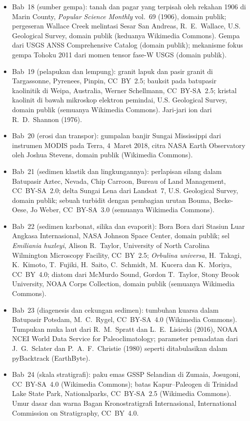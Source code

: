 \begin{itemize}
  \item Bab~18 (sumber gempa): tanah dan pagar yang terpisah oleh rekahan 1906 di Marin County, \emph{Popular Science Monthly} vol.~69 (1906), domain publik; pergeseran Wallace Creek melintasi Sesar San Andreas, R.~E.~Wallace, U.S. Geological Survey, domain publik (keduanya Wikimedia Commons). Gempa dari USGS ANSS Comprehensive Catalog (domain publik); mekanisme fokus gempa Tohoku 2011 dari momen tensor fase-W USGS (domain publik).
  \item Bab~19 (pelapukan dan lempung): granit lapuk dan pasir granit di Targassonne, Pyrenees, Pinpin, CC~BY~2.5; bauksit pada batupasir kaolinitik di Weipa, Australia, Werner Schellmann, CC~BY-SA~2.5; kristal kaolinit di bawah mikroskop elektron pemindai, U.S. Geological Survey, domain publik (semuanya Wikimedia Commons). Jari-jari ion dari R.~D.~Shannon (1976).
  \item Bab~20 (erosi dan transpor): gumpalan banjir Sungai Mississippi dari instrumen MODIS pada Terra, 4~Maret 2018, citra NASA Earth Observatory oleh Joshua Stevens, domain publik (Wikimedia Commons).
  \item Bab~21 (sedimen klastik dan lingkungannya): perlapisan silang dalam Batupasir Aztec, Nevada, Chip Carroon, Bureau of Land Management, CC~BY-SA~2.0; delta Sungai Lena dari Landsat~7, U.S. Geological Survey, domain publik; sebuah turbidit dengan pembagian urutan Bouma, Becke-Oese, Jo Weber, CC~BY-SA~3.0 (semuanya Wikimedia Commons).
  \item Bab~22 (sedimen karbonat, silika dan evaporit): Bora Bora dari Stasiun Luar Angkasa Internasional, NASA Johnson Space Center, domain publik; sel \emph{Emiliania huxleyi}, Alison R.~Taylor, University of North Carolina Wilmington Microscopy Facility, CC~BY~2.5; \emph{Orbulina universa}, H.~Takagi, K.~Kimoto, T.~Fujiki, H.~Saito, C.~Schmidt, M.~Kucera dan K.~Moriya, CC~BY~4.0; diatom dari McMurdo Sound, Gordon T.~Taylor, Stony Brook University, NOAA Corps Collection, domain publik (semuanya Wikimedia Commons).
  \item Bab~23 (diagenesis dan cekungan sedimen): tumbuhan kuarsa dalam Batupasir Potsdam, M.~C.~Rygel, CC~BY-SA~4.0 (Wikimedia Commons). Tumpukan muka laut dari R.~M.~Spratt dan L.~E.~Lisiecki (2016), NOAA NCEI World Data Service for Paleoclimatology; parameter pemadatan dari J.~G.~Sclater dan P.~A.~F.~Christie (1980) seperti ditabulasikan dalam pyBacktrack (EarthByte).
  \item Bab~24 (skala stratigrafi): paku emas GSSP Selandian di Zumaia, Josugoni, CC~BY-SA~4.0 (Wikimedia Commons); batas Kapur--Paleogen di Trinidad Lake State Park, Nationalparks, CC~BY-SA~2.5 (Wikimedia Commons). Umur dasar dan warna Bagan Kronostratigrafi Internasional, International Commission on Stratigraphy, CC~BY~4.0.

\end{itemize}
